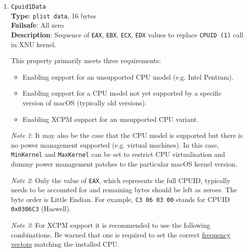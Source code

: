 \documentclass[]{article}
\providecommand{\tightlist}{%
  \setlength{\itemsep}{0pt}\setlength{\parskip}{0pt}}
\begin{document}
\begin{enumerate}
\item
  \texttt{Cpuid1Data}\\
  \textbf{Type}: \texttt{plist\ data}, 16 bytes\\
  \textbf{Failsafe}: All zero\\
  \textbf{Description}: Sequence of \texttt{EAX}, \texttt{EBX}, \texttt{ECX},
  \texttt{EDX} values to replace \texttt{CPUID (1)} call in XNU kernel.

  This property primarily meets three requirements:

  \begin{itemize}
    \tightlist
    \item Enabling support for an unsupported CPU model (e.g. Intel Pentium).
    \item Enabling support for a CPU model not yet supported by a specific version of macOS (typically old versions).
    \item Enabling XCPM support for an unsupported CPU variant.
  \end{itemize}

  \emph{Note 1}: It may also be the case that the CPU model is supported but there is no power management supported
  (e.g. virtual machines). In this case, \texttt{MinKernel} and \texttt{MaxKernel} can be set to restrict CPU virtualisation and dummy power
  management patches to the particular macOS kernel version.

  \emph{Note 2}: Only the value of \texttt{EAX}, which represents the full CPUID,
  typically needs to be accounted for and remaining bytes should be left as zeroes.
  The byte order is Little Endian. For example, \texttt{C3 06 03 00} stands for CPUID
  \texttt{0x0306C3} (Haswell).

  \emph{Note 3}: For XCPM support it is recommended to use the following combinations.
  Be warned that one is required to set the correct
  \href{https://github.com/dortania/bugtracker/issues/190}{frequency vectors} matching
  the installed CPU.


\end{enumerate}
\end{document}
